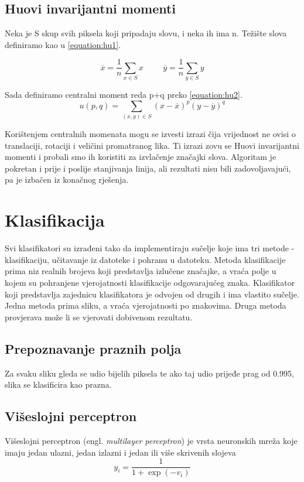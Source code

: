 \documentclass[a4paper,twocolumn,dvipdfm]{article}
\begin{document}
\subsection{Huovi invarijantni momenti}
Neka je S skup svih piksela koji pripadaju slovu, i neka ih ima n.
Težište slova definiramo kao u \ref{equation:hu1}.

\begin{equation}
\overline{x} = \frac{1}{n}\displaystyle\sum_{x \in S}x
\hspace{1cm}
\overline{y} = \frac{1}{n}\displaystyle\sum_{y \in S}y
\label{equation:hu1}
\end{equation}

Sada definiramo centralni moment reda p+q preko \ref{equation:hu2}.
\begin{equation}
u(p,q) = \displaystyle\sum_{(x,y) \in S}(x-\overline{x})^p(y-\overline{y})^q
\label{equation:hu2}
\end{equation}

Korištenjem centralnih momenata mogu se izvesti izrazi čija vrijednost ne ovisi
o translaciji, rotaciji i veličini promatranog lika. Ti izrazi zovu se Huovi
invarijantni momenti i probali smo ih koristiti za izvlačenje značajki slova.
Algoritam je pokretan i prije i poslije stanjivanja linija, ali rezultati nisu
bili zadovoljavajući, pa je izbačen iz konačnog rješenja.


\section{Klasifikacija}
Svi klasifikatori su izrađeni tako da implementiraju sučelje koje ima tri metode
- klasifikaciju, učitavanje iz datoteke i pohranu u datoteku. Metoda
klasifikacije prima niz realnih brojeva koji predstavlja izlučene značajke, a
vraća polje u kojem su pohranjene vjerojatnosti klasifikacije odgovarajućeg
znaka. Klasifikator koji predstavlja zajednicu klasifikatora je odvojen od
drugih i ima vlastito sučelje. Jedna metoda prima sliku, a vraća vjerojatnosti
po znakovima. Druga metoda provjerava može li se vjerovati dobivenom rezultatu.

\subsection{Prepoznavanje praznih polja}
Za svaku sliku gleda se udio bijelih piksela te ako taj udio prijeđe prag od
0.995, slika se klasificira kao prazna.

\subsection{Višeslojni perceptron}
Višeslojni perceptron \cite{rosenblatt1958perceptron} (engl. \emph{multilayer
perceptron}) je vrsta neuronskih mreža koje imaju jedan ulazni, jedan izlazni i
jedan ili više skrivenih slojeva
\begin{equation}
y_i = \frac{1}{1 + \exp(-v_i)}
\label{equation:sig}
\end{equation}
\end{document}
